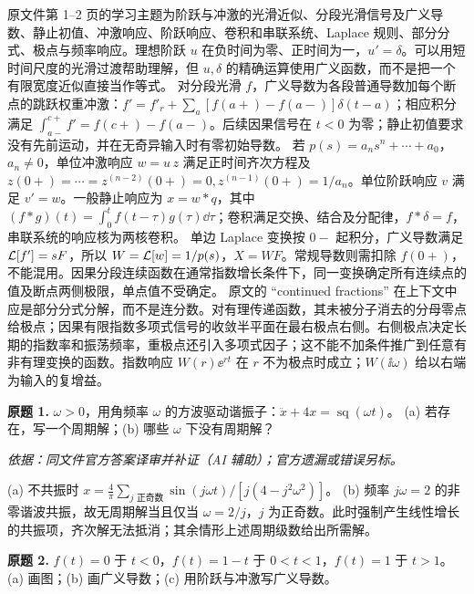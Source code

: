 原文件第 1--2 页的学习主题为阶跃与冲激的光滑近似、分段光滑信号及广义导数、静止初值、冲激响应、阶跃响应、卷积和串联系统、Laplace 规则、部分分式、极点与频率响应。理想阶跃 $u$ 在负时间为零、正时间为一，$u'=\delta$。可以用短时间尺度的光滑过渡帮助理解，但 $u,\delta$ 的精确运算使用广义函数，而不是把一个有限宽度近似直接当作等式。
对分段光滑 $f$，广义导数为各段普通导数加每个断点的跳跃权重冲激：$f'=f'_r+\sum_a[f(a+)-f(a-)]\delta(t-a)$；相应积分满足 $\int_{a-}^{c+}f'=f(c+)-f(a-)$。后续因果信号在 $t<0$ 为零；静止初值要求没有先前运动，并在无奇异输入时有零初始导数。
若 $p(s)=a_ns^n+\cdots+a_0$，$a_n\ne0$，单位冲激响应 $w=u\,z$ 满足正时间齐次方程及 $z(0+)=\cdots=z^{(n-2)}(0+)=0,z^{(n-1)}(0+)=1/a_n$。单位阶跃响应 $v$ 满足 $v'=w$。一般静止响应为 $x=w*q$，其中 $(f*g)(t)=\int_0^tf(t-\tau)g(\tau)\dd\tau$；卷积满足交换、结合及分配律，$f*\delta=f$，串联系统的响应核为两核卷积。
单边 Laplace 变换按 $0-$ 起积分，广义导数满足 $\mathcal L[f']=sF$，所以 $W=\mathcal L[w]=1/p(s)$，$X=WF$。常规导数则需扣除 $f(0+)$，不能混用。因果分段连续函数在通常指数增长条件下，同一变换确定所有连续点的值及断点两侧极限，单点值不受确定。
原文的 ``continued fractions'' 在上下文中应是部分分式分解，而不是连分数。对有理传递函数，其未被分子消去的分母零点给极点；因果有限指数多项式信号的收敛半平面在最右极点右侧。右侧极点决定长期的指数率和振荡频率，重极点还引入多项式因子；这不能不加条件推广到任意有非有理变换的函数。指数响应 $W(r)\ee^{rt}$ 在 $r$ 不为极点时成立；$W(\ii\omega)$ 给以右端为输入的复增益。
\begin{exercise}\label{cw:prex3-1}\textbf{原题 1.} $\omega>0$，用角频率 $\omega$ 的方波驱动谐振子：$\ddot x+4x=\operatorname{sq}(\omega t)$。
(a) 若存在，写一个周期解；(b) 哪些 $\omega$ 下没有周期解？
\end{exercise}
\begin{solution}
\textit{依据：同文件官方答案译审并补证（AI 辅助）；官方遗漏或错误另标。}\par
(a) 不共振时 $x=\tfrac4\pi\sum_{j\text{ 正奇数}}\sin(j\omega t)/[j(4-j^2\omega^2)]$。
(b) 频率 $j\omega=2$ 的非零谐波共振，故无周期解当且仅当 $\omega=2/j$，$j$ 为正奇数。此时强制产生线性增长的共振项，齐次解无法抵消；其余情形上述周期级数给出所需解。
\end{solution}
\begin{exercise}\label{cw:prex3-2}\textbf{原题 2.} $f(t)=0$ 于 $t<0$，$f(t)=1-t$ 于 $0<t<1$，$f(t)=1$ 于 $t>1$。
(a) 画图；(b) 画广义导数；(c) 用阶跃与冲激写广义导数。
\end{exercise}
